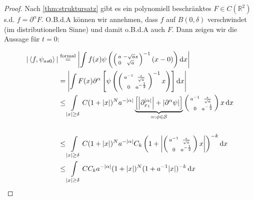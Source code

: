 \begin{proof}
    Nach \cref{thm:struktursatz} gibt es ein polynomiell beschränktes $F \in C(\mathbb{R}^2)$ s.d. $f = \partial^\alpha F$. O.B.d.A können wir annehmen, dass $f$ auf $B(0,\delta)$ verschwindet (im distributionellen Sinne) und damit o.B.d.A auch $F$. Dann zeigen wir die Aussage für $t=0$:

    \begin{align*}
        |\left \langle f, \psi_{as0} \right\rangle|
        &\stackrel{\textrm{formal}}{=}
        \left\lvert
        \int f(x) \psi\left(\left(\begin{smallmatrix}
            a & -\sqrt{a}s \\ 0 & \sqrt a
        \end{smallmatrix}
        \right)^{-1}\left(x-0\right)\right)
        \d x \right\rvert
        \\&=
        \left\lvert \int F(x) \partial^{\alpha}\left[
        \psi\left(\left(\begin{smallmatrix}
            a^{-1} & \frac{s}{\sqrt a} \\ 0 & a^{-\frac{1}{2}}
        \end{smallmatrix}
        \right)^{-1}x\right)\right]
        \d x \right\rvert
        \\ &\leq
        \int \limits_{|x| \geq \delta}
        C (1+|x|)^N
        a^{-|\alpha|}
        \underbrace{
        \left[
            \left\lvert \partial_{x_1}^{|\alpha|} \right\rvert
            + \left\lvert \partial^\alpha \psi \right\rvert
        \right]
        }_{=: \phi \in \mathcal{S}}
        \left(\begin{smallmatrix}
            a^{-1} & \frac{s}{\sqrt{a}} \\ 0 & a^{-\frac{1}{2}}
        \end{smallmatrix}\right) x \d x\\
        \\ &\leq
        \int \limits_{|x| \geq \delta}
        C (1+|x|)^N
        a^{-|\alpha|}
        C_k \left(
        1+ \left\lvert \left( \begin{smallmatrix}
            a^{-1} & \frac{s}{\sqrt{a}} \\ 0 & a^{-\frac{1}{2}}
        \end{smallmatrix}\right) x \right\rvert
        \right)^{-k}
        \d x
        \\ &\leq
        \int \limits_{|x| \geq \delta}
        C C_k a^{-|\alpha|} (1+|x|)^N (1+a^{-1}|x|)^{-k} \d x\\

\end{align*}
\end{proof}
